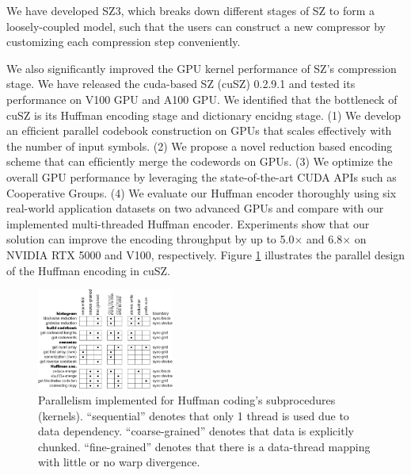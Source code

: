 We have developed SZ3, which breaks down different stages of SZ to form a loosely-coupled model, such that the users can construct a new compressor by customizing each compression step conveniently. %

We also significantly improved the GPU kernel performance of SZ's compression stage. We have released the cuda-based SZ (cuSZ) 0.2.9.1 and tested its performance on V100 GPU and A100 GPU. We identified that the bottleneck of cuSZ is its Huffman encoding stage and dictionary encidng stage. (1) We develop an efﬁcient parallel codebook construction on GPUs that scales effectively with the number of input symbols. (2) We propose a novel reduction based encoding scheme that can efﬁciently merge the codewords on GPUs. (3) We optimize the overall GPU performance by leveraging the state-of-the-art CUDA APIs such as Cooperative Groups. (4) We evaluate our Huffman encoder thoroughly using six real-world application datasets on two advanced GPUs and compare with our implemented multi-threaded Huffman encoder. Experiments show that our solution can improve the encoding throughput by up to 5.0$\times$ and 6.8$\times$ on NVIDIA RTX 5000 and V100, respectively. Figure \ref{fig:sz-huffman} illustrates the parallel design of the Huffman encoding in cuSZ. 
\begin{figure}
  \includegraphics[width=0.4\textwidth]{projects/2.3.4-DataViz/2.3.4.14-VeloC-SZ/SZ-Huffman}
  \caption{Parallelism implemented for Huffman coding’s subprocedures (kernels).
``sequential” denotes that only 1 thread is used due to data dependency.
``coarse-grained” denotes that data is explicitly chunked. ``fine-grained” denotes
that there is a data-thread mapping with little or no warp divergence.}%
  \label{fig:sz-huffman}%
\end{figure}


